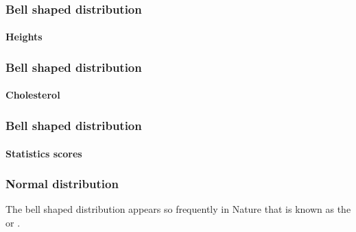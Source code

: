 \begin{frame}
\frametitle{Bell shaped distribution}
\framesubtitle{Heights}
\begin{center}
\scalebox{0.6}{}
\end{center} 
\end{frame}


\begin{frame}
\frametitle{Bell shaped distribution}
\framesubtitle{Cholesterol}
\begin{center}
\scalebox{0.6}{}
\end{center} 
\end{frame}  


\begin{frame}
\frametitle{Bell shaped distribution}
\framesubtitle{Statistics scores}
\begin{center}
\scalebox{0.6}{}
\end{center} 
\end{frame}  


\begin{frame}
\frametitle{Normal distribution}
The bell shaped distribution appears so frequently in Nature that is known as the  or .
\begin{center}
\scalebox{0.6}{}
\end{center} 
\end{frame}  
  


